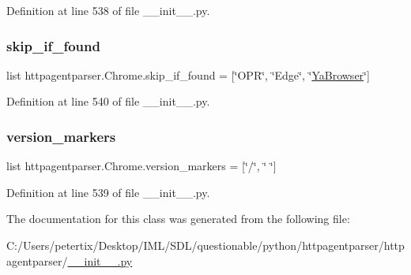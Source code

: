 Definition at line 538 of file \+\_\+\+\_\+init\+\_\+\+\_\+.\+py.

\hypertarget{classhttpagentparser_1_1_chrome_a6c91c362fbe10966edbc1da1820a3ddf}{}\label{classhttpagentparser_1_1_chrome_a6c91c362fbe10966edbc1da1820a3ddf} 
\subsubsection{\texorpdfstring{skip\+\_\+if\+\_\+found}{skip\_if\_found}}
{\footnotesize\ttfamily list httpagentparser.\+Chrome.\+skip\+\_\+if\+\_\+found = \mbox{[}\char`\"{}O\+PR\char`\"{}, \char`\"{}Edge\char`\"{}, \char`\"{}\hyperlink{classhttpagentparser_1_1_ya_browser}{Ya\+Browser}\char`\"{}\mbox{]}\hspace{0.3cm}{\ttfamily [static]}}



Definition at line 540 of file \+\_\+\+\_\+init\+\_\+\+\_\+.\+py.

\hypertarget{classhttpagentparser_1_1_chrome_a92610d7101505c3662e84d962e4d5e9e}{}\label{classhttpagentparser_1_1_chrome_a92610d7101505c3662e84d962e4d5e9e} 
\subsubsection{\texorpdfstring{version\+\_\+markers}{version\_markers}}
{\footnotesize\ttfamily list httpagentparser.\+Chrome.\+version\+\_\+markers = \mbox{[}\char`\"{}/\char`\"{}, \char`\"{} \char`\"{}\mbox{]}\hspace{0.3cm}{\ttfamily [static]}}



Definition at line 539 of file \+\_\+\+\_\+init\+\_\+\+\_\+.\+py.



The documentation for this class was generated from the following file\+:\begin{DoxyCompactItemize}
\item 
C\+:/\+Users/petertix/\+Desktop/\+I\+M\+L/\+S\+D\+L/questionable/python/httpagentparser/httpagentparser/\hyperlink{____init_____8py}{\+\_\+\+\_\+init\+\_\+\+\_\+.\+py}\end{DoxyCompactItemize}

